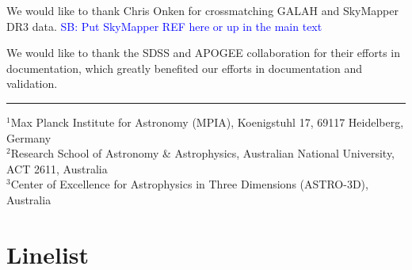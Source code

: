\documentclass[fleqn,usenatbib,useAMS]{mnras}
\newcommand\SB[1]{\textcolor{blue}{SB: #1}}
\begin{document}
We would like to thank Chris Onken for crossmatching GALAH and SkyMapper DR3 data. \SB{Put SkyMapper REF here or up in the main text}

We would like to thank the SDSS and APOGEE collaboration for their efforts in documentation, which greatly benefited our efforts in documentation and validation.







\newpage
\noindent \rule{8.5cm}{1pt}

\noindent
$^{1}$Max Planck Institute  for Astronomy (MPIA), Koenigstuhl 17, 69117 Heidelberg, Germany\\
$^{2}$Research School of Astronomy \& Astrophysics, Australian National University, ACT 2611, Australia\\
$^{3}$Center of Excellence for Astrophysics in Three Dimensions (ASTRO-3D), Australia\\


\appendix

\section{Linelist}\label{sec:linelist}
\end{document}
